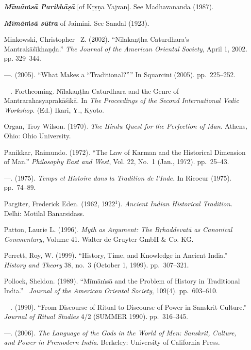 \begin{thebibliography}{99}
  \textbf{\textit{Mīmāṁsā Paribhāṣā}} [of Kṛṣṇa Yajvan]. See Madhavananda (1987).

  \textbf{\textit{Mīmāṁsā sūtra}} of Jaimini. See Sandal (1923).

  Minkowski, Christopher  Z. (2002). “Nīlakaṇṭha Caturdhara's Mantrakāśīkhaṇḍa.” \textit{The Journal of the American Oriental Society}, April 1, 2002. pp. 329--344.

  —. (2005). “What Makes a “Traditional?”” In Squarcini (2005). pp.~225--252.

  —. Forthcoming. Nīlakaṇṭha Caturdhara and the Genre of Mantrarahasyaprakāśikā. In \textit{The Proceedings of the Second International Vedic Workshop}. (Ed.) Ikari, Y., Kyoto.

  Organ, Troy Wilson. (1970). \textit{The Hindu Quest for the Perfection of Man}. Athens, Ohio: Ohio University.

  Panikkar, Raimundo. (1972). “The Law of Karman and the Historical Dimension of Man.” \textit{Philosophy East and West}, Vol. 22, No.~1 (Jan., 1972). pp.~25--43.

  —. (1975). \textit{Temps et Histoire dans la Tradition de l’Inde.} In Ricoeur (1975). pp.~74--89.

  Pargiter, Frederick Eden. (1962, 1922$^{1}$). \textit{Ancient Indian Historical Tradition}. Delhi: Motilal Banarsidass.

  Patton, Laurie L. (1996). \textit{Myth as Argument: The Bṛhaddevatā as Canonical Commentary}, Volume 41. Walter de Gruyter GmbH \& Co. KG.

  Perrett, Roy, W. (1999). “History, Time, and Knowledge in Ancient India.” \textit{History and Theory} 38, no.~3 (October 1, 1999). pp.~307--321.

  Pollock, Sheldon. (1989). “Mīmāṁsā and the Problem of History in Traditional India.”  \textit{Journal of the American Oriental Society}, 109(4). pp.~603--610.

  —. (1990). “From Discourse of Ritual to Discourse of Power in Sanskrit Culture.” \textit{Journal of Ritual Studies} 4/2 (SUMMER 1990). pp.~316--345.

  —. (2006). \textit{The Language of the Gods in the World of Men: Sanskrit, Culture, and Power in Premodern India}. Berkeley: University of California Press.


\end{thebibliography}

